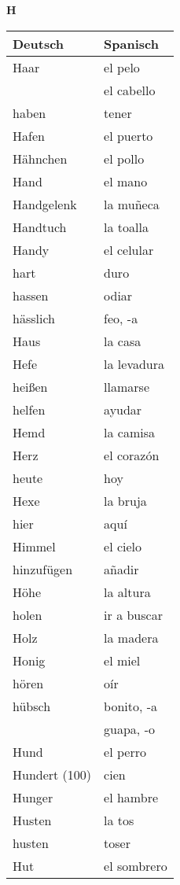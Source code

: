 \begin{flushright}\begin{Huge}\textbf{H}\end{Huge}\end{flushright}

\begin{longtable}{p{} p{}} 
\textbf{Deutsch}     & \textbf{Spanisch}                                       \\ \hline
\hline
\endhead %
Haar & el pelo\\
~ & el cabello\\
haben & tener\\
Hafen & el puerto\\
Hähnchen & el pollo\\
Hand & el mano\\
Handgelenk & la muñeca\\
Handtuch & la toalla\\
Handy & el celular\\
hart & duro\\
hassen & odiar\\
hässlich & feo, -a\\
Haus & la casa\\
Hefe & la levadura\\
heißen & llamarse\\
helfen & ayudar\\
Hemd & la camisa\\
Herz  & el corazón \\
heute & hoy\\
Hexe & la bruja\\
hier & aquí\\
Himmel & el cielo\\
hinzufügen & añadir\\
Höhe & la altura \\
holen & ir a buscar\\
Holz & la madera\\
Honig & el miel\\
hören & oír\\
hübsch & bonito, -a\\
~ & guapa, -o\\
Hund & el perro\\
Hundert (100) & cien\\
Hunger & el hambre\\
Husten & la tos\\
husten & toser\\
Hut & el sombrero\\

\end{longtable}
